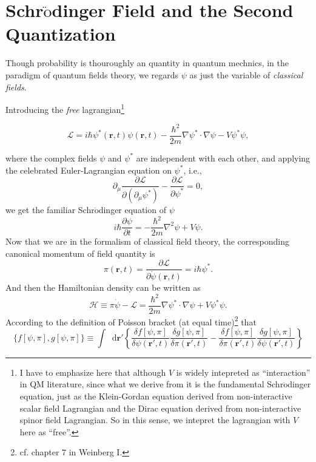 \documentclass[b5paper,10pt,UTF8]{book}
\newcommand*\dd{\mathop{}\!\mathrm{d}}
\numberwithin{equation}{section}
\begin{document}
	\section{Schr$\ddot{\text{o}}$dinger Field and the Second Quantization}
		\indent Though probability is thouroughly an quantity in quantum mechnics, in the paradigm of quantum fields theory, we regards $\psi$ as just the variable of \emph{classical fields}. \par
		Introducing the \emph{free} lagrangian\footnote{I have to emphasize here that although $V$ is widely intepreted as ``interaction'' in QM literature, since what we derive from it is the fundamental Schr$\ddot{\text{o}}$dinger equation, just as the Klein-Gordan equation derived from non-interactive scalar field Lagrangian and the Dirac equation derived from non-interactive spinor field Lagrangian. So in this sense, we intepret the lagrangian with $V$ here as ``free''.}
		\begin{Def}
			\begin{equation}\label{1.2.1}
				\mathcal{L}=i\hbar\psi^*(\bm{r},t)\psi(\bm{r},t)-\dfrac{\hbar^2}{2m}\nabla\psi^*\cdot\nabla\psi-V\psi^*\psi,
			\end{equation}
		\end{Def}
		where the complex fields $\psi$ and $\psi^*$ are independent with each other, and applying the celebrated Euler-Lagrangian equation on $\psi^*$, i.e.,
		$$\partial_\mu\dfrac{\partial\mathcal{L}}{\partial(\partial_\mu\psi^*)}-\dfrac{\partial\mathcal{L}}{\partial\psi^*}=0,$$
		we get the familiar Schr$\ddot{\text{o}}$dinger equation of $\psi$
		$$i\hbar\dfrac{\partial \psi}{\partial t}=-\dfrac{\hbar^2}{2m}\nabla^2\psi+V\psi.$$
		\indent Now that we are in the formalism of classical field theory, the corresponding canonical momentum of field quantity is
		\begin{equation}\label{1.2.2}
			\pi(\bm{r},t)=\dfrac{\partial\mathcal{L}}{\partial\dot{\psi}(\bm{r},t)}=i\hbar\psi^*.
		\end{equation}
		And then the Hamiltonian density can be written as
		\begin{equation}\label{1.2.3}
			\mathcal{H}\equiv \pi\dot{\psi}-\mathcal{L}=\dfrac{\hbar^2}{2m}\nabla\psi^*\cdot\nabla\psi+V\psi^*\psi.
		\end{equation}
		\indent According to the definition of Poisson bracket (at equal time)\footnote{cf. chapter $7$ in Weinberg I.} that
		$$\big\{f[\psi,\pi],g[\psi,\pi]\big\}\equiv\int\dd\bm{r'}\left\{\dfrac{\delta f[\psi,\pi]}{\delta\psi(\bm{r'},t)}\dfrac{\delta g[\psi,\pi]}{\delta\pi(\bm{r'},t)}-\dfrac{\delta f[\psi,\pi]}{\delta\pi(\bm{r'},t)}\dfrac{\delta g[\psi,\pi]}{\delta\psi(\bm{r'},t)}\right\}$$
\end{document}
